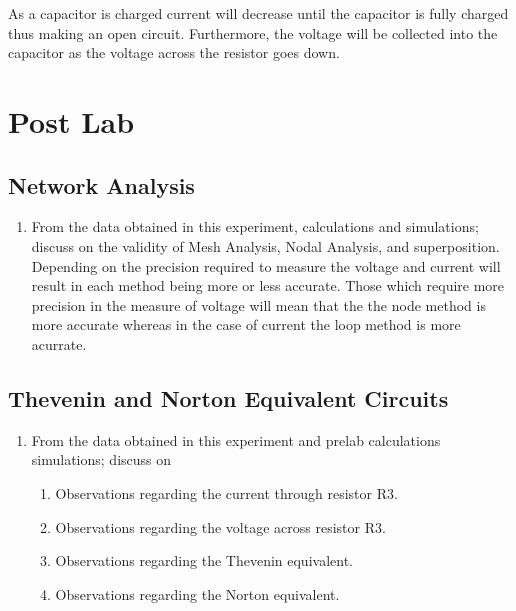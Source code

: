 \documentclass[a4paper]{article}
\begin{document}
As a capacitor is charged current will decrease until the capacitor is fully charged thus making an open circuit. Furthermore, the voltage will be collected into the capacitor as the voltage across the resistor goes down.

\section{Post Lab}

\subsection{Network Analysis}

\begin{enumerate}
    \item From the data obtained in this experiment, calculations and simulations; discuss on the validity of Mesh Analysis, Nodal Analysis, and superposition.\\
    Depending on the precision required to measure the voltage and current will result in each method being more or less accurate. Those which require more precision in the measure of voltage will mean that the 
    the node method is more accurate whereas in the case of current the loop method is more acurrate.
\end{enumerate}
    

\subsection{Thevenin and Norton Equivalent Circuits}

\begin{enumerate}
    \item From the data obtained in this experiment and prelab calculations simulations; discuss on\\
    \begin{enumerate}
        \item Observations regarding the current through resistor R3.\\
        \item Observations regarding the voltage across resistor R3.\\
        \item Observations regarding the Thevenin equivalent.\\
        \item Observations regarding the Norton equivalent.\\
    \end{enumerate}
\end{enumerate}
\end{document}
